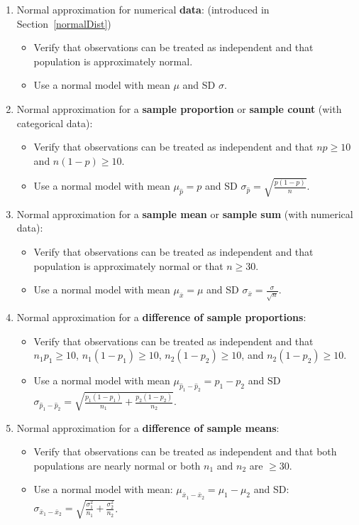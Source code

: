 \begin{enumerate}

\item Normal approximation for numerical \textbf{data}:  (introduced in Section~\ref{normalDist})
\begin{itemize}
\item Verify that observations can be treated as independent and that population is approximately normal.
\item Use a normal model with mean $\mu$ and SD $\sigma$.
\end{itemize}

\item Normal approximation for a \textbf{sample proportion} or \textbf{sample count} (with categorical data):  
\begin{itemize}
\item Verify that observations can be treated as independent and that $np\ge 10$ and $n(1-p)\ge 10$.
\item Use a normal model with mean $\mu_{\hat{p}} = p$ and SD $\sigma_{\hat{p}} = \sqrt{\frac{p(1-p)}{n}}$.
\end{itemize}


\item Normal approximation for a \textbf{sample mean} or \textbf{sample sum} (with numerical data): 
\begin{itemize} 
\item Verify that observations can be treated as independent and that population is approximately normal or that $n\ge 30$.
\item Use a normal model with mean $\mu_{\bar{x}}=\mu$ and SD $\sigma_{\bar{x}}=\frac{\sigma}{\sqrt{n}}$.
\end{itemize}

\item  Normal approximation for a \textbf{difference of sample proportions}:
\begin{itemize}
\item Verify that observations can be treated as independent and that  \\$n_1p_1\ge 10$, $n_1(1-p_1)\ge 10$, $n_2(1-p_2)\ge 10$, and $n_2(1-p_2)\ge 10$.
\item Use a normal model with mean $\mu_{\hat{p}_1-\hat{p}_2} = p_1-p_2$ and SD $\sigma_{\hat{p}_1-\hat{p}_2}=  \sqrt{\frac{p_1(1-p_1)}{n_1} + \frac{p_2(1-p_2)}{n_2}}$.
\end{itemize}


\item  Normal approximation for a \textbf{difference of sample means}:
\begin{itemize}
\item Verify that observations can be treated as independent and that both populations are nearly normal or both $n_1$ and $n_2$ are $\ge 30$.  
\item Use a normal model with mean: $\mu_{\bar{x}_1 - \bar{x}_2} = \mu_1 - \mu_2$ and SD: $\sigma_{\bar{x}_1 - \bar{x}_2}= \sqrt{\frac{\sigma_1^2}{n_1} + \frac{\sigma_2^2}{n_2}}$.
\end{itemize}

\end{enumerate}


